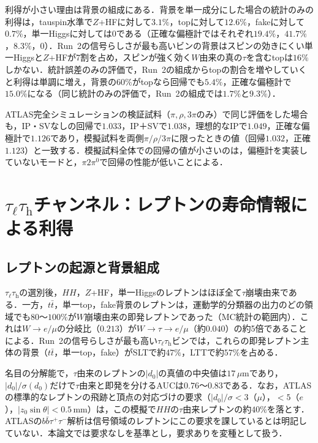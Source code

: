 \documentclass[paper=a4,fontsize=10pt,jafontsize=10pt,line_length=44zw,number_of_lines=46]{jlreq}
\newcommand{\tauh}{\tau_{\mathrm{h}}}
\newcommand{\taul}{\tau_{\ell}}
\newcommand{\bbtt}{b\bar b\tau^+\tau^-}
\begin{document}
利得が小さい理由は背景の組成にある．背景を単一成分にした場合の統計のみの利得は，tauspin水準で$Z$+HFに対して$3.1\%$，topに対して$12.6\%$，fakeに対して$0.7\%$，単一Higgsに対しては0である（正確な偏極計ではそれぞれ$19.4\%$，$41.7\%$，$8.3\%$，0）．Run~2の信号らしさが最も高いビンの背景はスピンの効きにくい単一Higgsと$Z$+HFが7割を占め，スピンが強く効く$W$由来の真の$\tau$を含むtopは$16\%$しかない．統計誤差のみの評価で，Run~2の組成からtopの割合を増やしていくと利得は単調に増え，背景の$60\%$がtopなら回帰でも$5.4\%$，正確な偏極計で$15.0\%$になる（同じ統計のみの評価で，Run~2の組成では$1.7\%$と$9.3\%$）．

ATLAS完全シミュレーションの検証試料（$\pi,\rho,3\pi$のみ）で同じ評価をした場合も，IP・SVなしの回帰で$1.033$，IP＋SVで$1.038$，理想的なIPで$1.049$，正確な偏極計で$1.126$であり，模擬試料を両側$\pi/\rho/3\pi$に限ったときの値（回帰$1.032$，正確$1.123$）と一致する．模擬試料全体での回帰の値が小さいのは，偏極計を実装していないモードと，$\pi2\pi^0$で回帰の性能が低いことによる．

\section{$\taul\tauh$チャンネル：レプトンの寿命情報による利得}\label{sec:lephad}

\subsection{レプトンの起源と背景組成}

$\taul\tauh$の選別後，$HH$，$Z$+HF，単一Higgsのレプトンはほぼ全て$\tau$崩壊由来である．一方，$t\bar t$，単一top，fake背景のレプトンは，運動学的分類器の出力のどの領域でも$80$〜$100\%$が$W$崩壊由来の即発レプトンであった（MC統計の範囲内）．これは$W\to e/\mu$の分岐比（$0.213$）が$W\to\tau\to e/\mu$（約$0.040$）の約5倍であることによる．Run~2の信号らしさが最も高い$\taul\tauh$ビン\cite{ATLAS:2022xzm}では，これらの即発レプトン主体の背景（$t\bar t$，単一top，fake）がSLTで約$47\%$，LTTで約$57\%$を占める．

名目の分解能で，$\tau$由来のレプトンの$|d_0|$の真値の中央値は$17\,\mu$mであり，$|d_0|/\sigma(d_0)$だけで$\tau$由来と即発を分けるAUCは$0.76$〜$0.83$である．なお，ATLASの標準的なレプトンの飛跡と頂点の対応づけの要求（$|d_0|/\sigma<3$（$\mu$），$<5$（$e$），$|z_0\sin\theta|<0.5$\,mm）は，この模擬で$HH$の$\tau$由来レプトンの約$40\%$を落とす．ATLASの$\bbtt$解析\cite{ATLAS:2022xzm}は信号領域のレプトンにこの要求を課しているとは明記していない．本論文では要求なしを基準とし，要求ありを変種として扱う．
\end{document}
